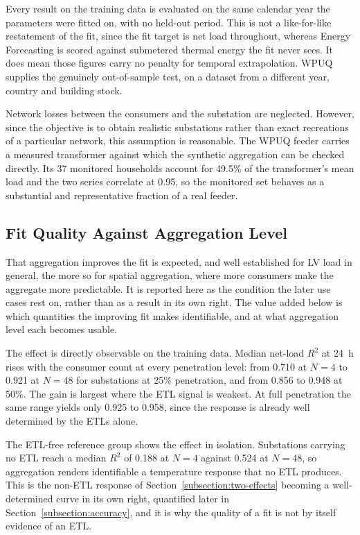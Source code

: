 \documentclass[9pt,journal,a4]{IEEEtran}
\begin{document}
Every result on the training data is evaluated on the same calendar year the parameters were fitted on, with no held-out period. This is not a like-for-like restatement of the fit, since the fit target is net load throughout, whereas Energy Forecasting is scored against submetered thermal energy the fit never sees. It does mean those figures carry no penalty for temporal extrapolation. WPUQ supplies the genuinely out-of-sample test, on a dataset from a different year, country and building stock.

Network losses between the consumers and the substation are neglected. However, since the objective is to obtain realistic substations rather than exact recreations of a particular network, this assumption is reasonable. The WPUQ feeder carries a measured transformer against which the synthetic aggregation can be checked directly. Its 37 monitored households account for 49.5\% of the transformer's mean load and the two series correlate at 0.95, so the monitored set behaves as a substantial and representative fraction of a real feeder.


\subsection{Fit Quality Against Aggregation Level}
\label{subsection:fitquality}

That aggregation improves the fit is expected, and well established for LV load in general, the more so for spatial aggregation, where more consumers make the aggregate more predictable. It is reported here as the condition the later use cases rest on, rather than as a result in its own right. The value added below is which quantities the improving fit makes identifiable, and at what aggregation level each becomes usable.

The effect is directly observable on the training data. Median net-load $R^2$ at 24~h rises with the consumer count at every penetration level: from 0.710 at $N = 4$ to 0.921 at $N = 48$ for substations at 25\% penetration, and from 0.856 to 0.948 at 50\%. The gain is largest where the ETL signal is weakest. At full penetration the same range yields only 0.925 to 0.958, since the response is already well determined by the ETLs alone.

The ETL-free reference group shows the effect in isolation. Substations carrying no ETL reach a median $R^2$ of 0.188 at $N = 4$ against 0.524 at $N = 48$, so aggregation renders identifiable a temperature response that no ETL produces. This is the non-ETL response of Section~\ref{subsection:two-effects} becoming a well-determined curve in its own right, quantified later in Section~\ref{subsection:accuracy}, and it is why the quality of a fit is not by itself evidence of an ETL.
\end{document}

